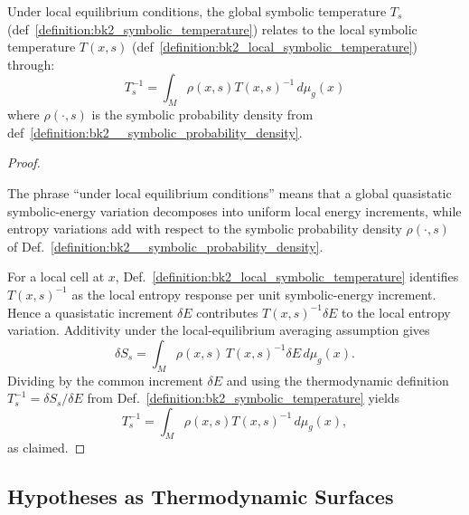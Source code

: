 \begin{proposition} 
\label{proposition:bk2_global_local_temp_relation} 
Under local equilibrium conditions, the global symbolic temperature $T_s$ (def~\ref{definition:bk2_symbolic_temperature}) relates to the local symbolic temperature $T(x,s)$ (def~\ref{definition:bk2_local_symbolic_temperature}) through:
\[
T_s^{-1} = \int_M \rho(x,s) T(x,s)^{-1} \, d\mu_g(x)
\]
where $\rho(\cdot,s)$ is the symbolic probability density from def~\ref{definition:bk2__symbolic_probability_density}.
\end{proposition}

\begin{proof}
\label{proof:bk2_global_local_temp_relation}
\leavevmode

\begin{assumption}
The phrase ``under local equilibrium conditions'' means that a global
quasistatic symbolic-energy variation decomposes into uniform local energy
increments, while entropy variations add with respect to the symbolic
probability density $\rho(\cdot,s)$ of Def.~\ref{definition:bk2__symbolic_probability_density}.
\end{assumption}

For a local cell at $x$, Def.~\ref{definition:bk2_local_symbolic_temperature}
identifies $T(x,s)^{-1}$ as the local entropy response per unit symbolic-energy
increment. Hence a quasistatic increment $\delta E$ contributes
$T(x,s)^{-1}\delta E$ to the local entropy variation. Additivity under the
local-equilibrium averaging assumption gives
\[
\delta S_s
  = \int_M \rho(x,s)\,T(x,s)^{-1}\delta E\,d\mu_g(x).
\]
Dividing by the common increment $\delta E$ and using the thermodynamic
definition $T_s^{-1}=\delta S_s/\delta E$ from Def.~\ref{definition:bk2_symbolic_temperature}
yields
\[
T_s^{-1} = \int_M \rho(x,s) T(x,s)^{-1}\,d\mu_g(x),
\]
as claimed.
\end{proof}

\subsection{Hypotheses as Thermodynamic Surfaces}
\label{subsec:bk2_hypotheses_thermodynamic_surfaces}

